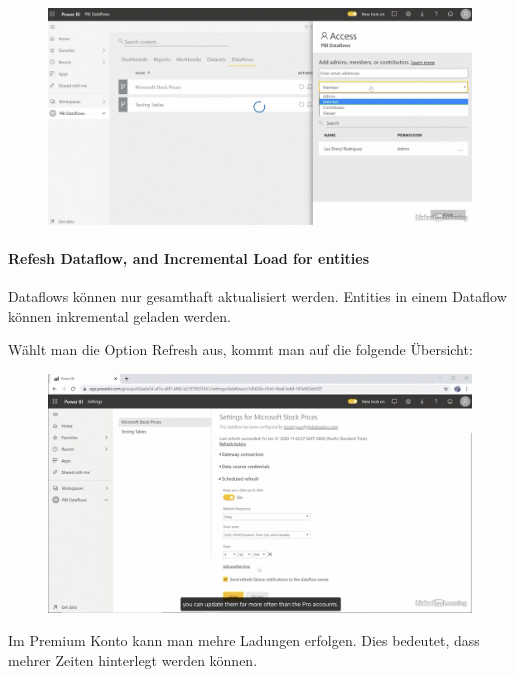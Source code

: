 \begin{figure}[H]
	\centering
	\includegraphics[scale = 0.3]{attachment/chapter_1/Scc143}
\end{figure}

\paragraph{Refesh Dataflow, and Incremental Load for entities}
Dataflows können nur gesamthaft aktualisiert werden. Entities in einem Dataflow können inkremental geladen werden.

Wählt man die Option Refresh aus, kommt man auf die folgende Übersicht:
\begin{figure}[H]
	\centering
	\includegraphics[scale = 0.3]{attachment/chapter_1/Scc144}
\end{figure}

Im Premium Konto kann man mehre Ladungen erfolgen. Dies bedeutet, dass mehrer Zeiten hinterlegt werden können.

